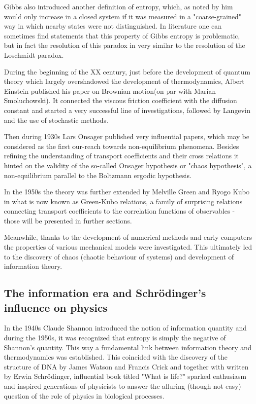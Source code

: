 \documentclass[a4paper,12pt]{article}
\begin{document}
Gibbs also introduced another definition of entropy, which, as noted by him \cite{Gibbs:1928tw} would only increase in a closed system if it was measured in a "coarse-grained" way in which nearby states were not distinguished. In literature one can sometimes find statements \cite{Evans:2241458} that this property of Gibbs entropy is problematic, but in fact the resolution of this paradox in very similar to the resolution of the Loschmidt paradox.

During the beginning of the XX century, just before 
the development of quantum theory which largely overshadowed the development of thermodynamics, Albert Einstein published his paper on Brownian motion\cite{Einstein:eEYNf903}(on par with Marian Smoluchowski). It connected the viscous friction coefficient with the diffusion constant and started a very successful line of investigations, followed by Langevin and the use of stochastic methods.

Then during 1930s Lars Onsager published very influential papers\cite{Onsager:zgWBDrcO, Onsager:sJs1Kffm}, which may be considered as the first our-reach towards non-equilibrium phenomena.
Besides refining the understanding of transport coefficients and their cross relations it hinted on the validity of the so-called Onsager hypothesis or "chaos hypothesis", a non-equilibrium parallel to the Boltzmann ergodic hypothesis.

In the 1950s the theory was further extended by Melville Green and Ryogo Kubo in what is now known as Green-Kubo relations\cite{Kubo:1957cl}, a family of surprising relations connecting transport coefficients to the correlation functions of observables - those will be presented in further sections. 

Meanwhile, thanks to the development of numerical methods and early computers the properties of various mechanical models were investigated.
This ultimately led to the discovery of chaos (chaotic behaviour of systems) and development of information theory.

\subsection{The information era and Schrödinger's influence on physics}

In the 1940s Claude Shannon introduced the notion of information quantity \cite{Shannon:429164} and during the 1950s, it was recognized that entropy is simply the negative of Shannon's quantity. This way a fundamental link between information theory and thermodynamics was established. This coincided with the discovery of the structure of DNA by James Watson and Francis Crick and together with written by Erwin Schrödinger, influential book titled "What is life?" sparked enthusiasm and inspired generations of physicists to answer the alluring (though not easy) question of the role of physics in biological processes. 
\end{document}
